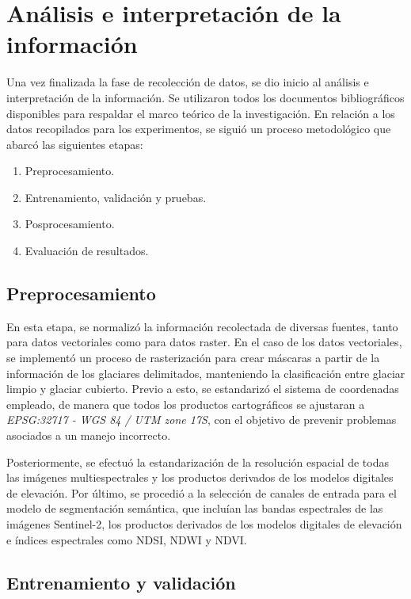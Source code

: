 \section{Análisis e interpretación de la información}
\label{sec:AnalisisInterpretacionInformacion}

Una vez finalizada la fase de recolección de datos, se dio inicio al análisis e interpretación de la información. Se utilizaron todos los documentos bibliográficos disponibles para respaldar el marco teórico de la investigación. En relación a los datos recopilados para los experimentos, se siguió un proceso metodológico que abarcó las siguientes etapas:

\begin{enumerate}
    \item Preprocesamiento.
    \item Entrenamiento, validación y pruebas.
    \item Posprocesamiento.
    \item Evaluación de resultados.
\end{enumerate}

\subsection{Preprocesamiento}

En esta etapa, se normalizó la información recolectada de diversas fuentes, tanto para datos vectoriales como para datos raster. En el caso de los datos vectoriales, se implementó un proceso de rasterización para crear máscaras a partir de la información de los glaciares delimitados, manteniendo la clasificación entre glaciar limpio y glaciar cubierto. Previo a esto, se estandarizó el sistema de coordenadas empleado, de manera que todos los productos cartográficos se ajustaran a \textit{EPSG:32717 - WGS 84 / UTM zone 17S}, con el objetivo de prevenir problemas asociados a un manejo incorrecto.

Posteriormente, se efectuó la estandarización de la resolución espacial de todas las imágenes multiespectrales y los productos derivados de los modelos digitales de elevación. Por último, se procedió a la selección de canales de entrada para el modelo de segmentación semántica, que incluían las bandas espectrales de las imágenes Sentinel-2, los productos derivados de los modelos digitales de elevación e índices espectrales como NDSI, NDWI y NDVI.

\subsection{Entrenamiento y validación}

